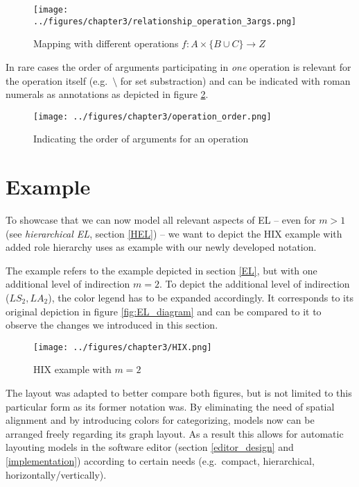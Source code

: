 \documentclass[twoside, openright, 12pt]{book}
\begin{document}
\begin{figure}[!htb]
	\centering
	\texttt{[image: ../figures/chapter3/relationship\_operation\_3args.png]}
	\caption{Mapping with different operations $f:A \times \lbrace B \cup C \rbrace \rightarrow Z$ }
	\label{fig:relationship_operation_3args}
\end{figure}

\noindent
In rare cases the order of arguments participating in \textit{one} operation is relevant for the operation itself (e.g.~$\setminus$ for set substraction) and can be indicated with roman numerals as annotations as depicted in figure \ref{fig:operation_order}.

\begin{figure}[!htb]
	\centering
	\texttt{[image: ../figures/chapter3/operation\_order.png]}
	\caption{Indicating the order of arguments for an operation}
	\label{fig:operation_order}
\end{figure}



\section{Example}
\label{gsl_example}
To showcase that we can now model all relevant aspects of EL -- even for $m>1$ (see \textit{hierarchical EL}, section \ref{HEL}) -- we want to depict the HIX example with added role hierarchy \cite{Amthor18} uses as example with our newly developed notation.

\noindent
The example refers to the example depicted in section \ref{EL}, but with one additional level of indirection $m=2$.
To depict the additional level of indirection ($LS_2, LA_2$), the color legend has to be expanded accordingly.
It corresponds to its original depiction in figure \ref{fig:EL_diagram} and can be compared to it to observe the changes we introduced in this section.

\begin{figure}[htb]
	\centering
	\texttt{[image: ../figures/chapter3/HIX.png]}
	\caption{HIX example with $m=2$ \citep{Amthor18}}
	\label{fig:HIX}
\end{figure}

\noindent
The layout was adapted to better compare both figures, but is not limited to this particular form as its former notation was.
By eliminating the need of spatial alignment and by introducing colors for categorizing, models now can be arranged freely regarding its graph layout.
As a result this allows for automatic layouting models in the software editor (section \ref{editor_design} and \ref{implementation}) according to certain needs (e.g.~compact, hierarchical, horizontally/vertically).
\end{document}
